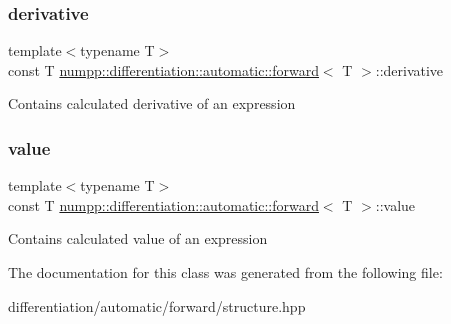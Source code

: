 \subsubsection{\texorpdfstring{derivative}{derivative}}
{\footnotesize\ttfamily template$<$typename T$>$ \\
const T \hyperlink{classnumpp_1_1differentiation_1_1automatic_1_1forward}{numpp\+::differentiation\+::automatic\+::forward}$<$ T $>$\+::derivative}

Contains calculated derivative of an expression \mbox{\label{classnumpp_1_1differentiation_1_1automatic_1_1forward_a64a2339eab5772de4da0483fd5c4f895}} 
\subsubsection{\texorpdfstring{value}{value}}
{\footnotesize\ttfamily template$<$typename T$>$ \\
const T \hyperlink{classnumpp_1_1differentiation_1_1automatic_1_1forward}{numpp\+::differentiation\+::automatic\+::forward}$<$ T $>$\+::value}

Contains calculated value of an expression 

The documentation for this class was generated from the following file\+:\begin{DoxyCompactItemize}
\item 
differentiation/automatic/forward/structure.\+hpp\end{DoxyCompactItemize}

